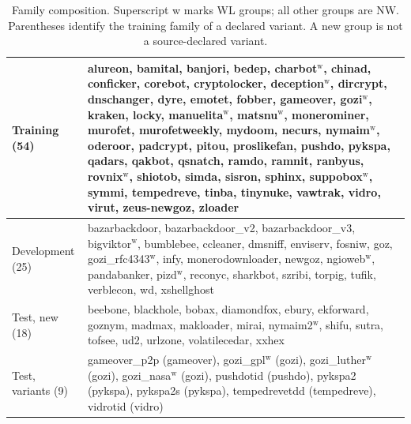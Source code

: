 \begin{table}[!t]
\caption{Family composition. Superscript w marks WL groups; all other groups are NW. Parentheses identify the training family of a declared variant. A new group is not a source-declared variant.}
\label{tab:families-full}
\centering\scriptsize
\begin{tabular}{@{}p{}p{}@{}}
\toprule
Training (54) & alureon, bamital, banjori, bedep, charbot$^{\mathrm{w}}$, chinad, conficker, corebot, cryptolocker, deception$^{\mathrm{w}}$, dircrypt, dnschanger, dyre, emotet, fobber, gameover, gozi$^{\mathrm{w}}$, kraken, locky, manuelita$^{\mathrm{w}}$, matsnu$^{\mathrm{w}}$, monerominer, murofet, murofetweekly, mydoom, necurs, nymaim$^{\mathrm{w}}$, oderoor, padcrypt, pitou, proslikefan, pushdo, pykspa, qadars, qakbot, qsnatch, ramdo, ramnit, ranbyus, rovnix$^{\mathrm{w}}$, shiotob, simda, sisron, sphinx, suppobox$^{\mathrm{w}}$, symmi, tempedreve, tinba, tinynuke, vawtrak, vidro, virut, zeus-newgoz, zloader \\
\midrule
Development (25) & bazarbackdoor, bazarbackdoor\_v2, bazarbackdoor\_v3, bigviktor$^{\mathrm{w}}$, bumblebee, ccleaner, dmsniff, enviserv, fosniw, goz, gozi\_rfc4343$^{\mathrm{w}}$, infy, monerodownloader, newgoz, ngioweb$^{\mathrm{w}}$, pandabanker, pizd$^{\mathrm{w}}$, reconyc, sharkbot, szribi, torpig, tufik, verblecon, wd, xshellghost \\
\midrule
Test, new (18) & beebone, blackhole, bobax, diamondfox, ebury, ekforward, goznym, madmax, makloader, mirai, nymaim2$^{\mathrm{w}}$, shifu, sutra, tofsee, ud2, urlzone, volatilecedar, xxhex \\
\midrule
Test, variants (9) & gameover\_p2p (gameover), gozi\_gpl$^{\mathrm{w}}$ (gozi), gozi\_luther$^{\mathrm{w}}$ (gozi), gozi\_nasa$^{\mathrm{w}}$ (gozi), pushdotid (pushdo), pykspa2 (pykspa), pykspa2s (pykspa), tempedrevetdd (tempedreve), vidrotid (vidro) \\
\bottomrule
\end{tabular}
\end{table}
